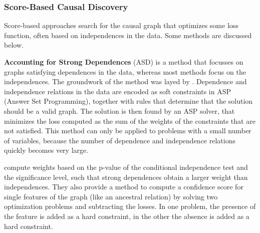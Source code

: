 

    
\subsubsection{Score-Based Causal Discovery}
Score-based approaches search for the causal graph that optimizes some loss function, often based on independences in the data. Some methods are discussed below.

\textbf{Accounting for Strong Dependences} (ASD) is a method that focusses on graphs satisfying dependences in the data, whereas most methods focus on the independences. The groundwork of the method was layed by \citet{hyttinen2014constraint}. Dependence and independence relations in the data are encoded as soft constraints in ASP (Answer Set Programming), together with rules that determine that the solution should be a valid graph. The solution is then found by an ASP solver, that minimizes the loss computed as the sum of the weights of the constraints that are not satisfied. This method can only be applied to problems with a small number of variables, because the number of dependence and independence relations quickly becomes very large.

\citet{magliacane2016ancestral} compute weights based on the p-value of the conditional independence test and the significance level, such that strong dependences obtain a larger weight than independences. They also provide a method to compute a confidence score for single features of the graph (like an ancestral relation) by solving two optimization problems and subtracting the losses. In one problem, the presence of the feature is added as a hard constraint, in the other the absence is added as a hard constraint. 

